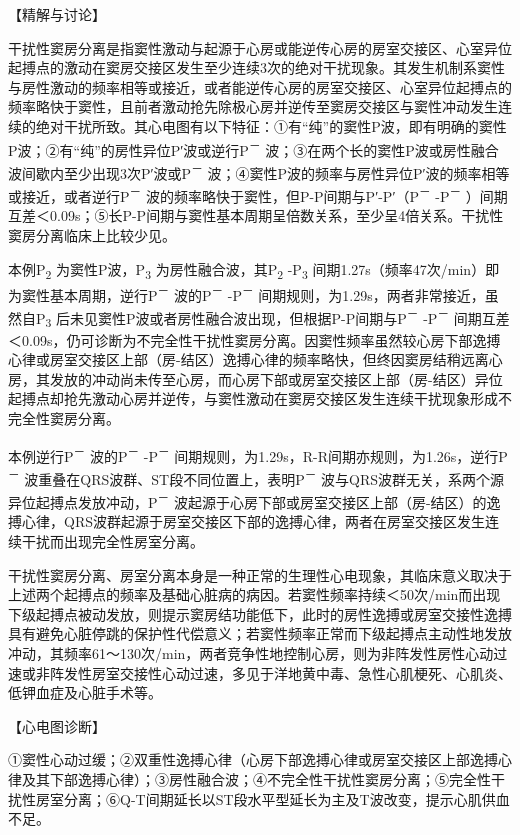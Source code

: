【精解与讨论】

干扰性窦房分离是指窦性激动与起源于心房或能逆传心房的房室交接区、心室异位起搏点的激动在窦房交接区发生至少连续3次的绝对干扰现象。其发生机制系窦性与房性激动的频率相等或接近，或者能逆传心房的房室交接区、心室异位起搏点的频率略快于窦性，且前者激动抢先除极心房并逆传至窦房交接区与窦性冲动发生连续的绝对干扰所致。其心电图有以下特征：①有“纯”的窦性P波，即有明确的窦性P波；②有“纯”的房性异位P′波或逆行P\textsuperscript{－}
波；③在两个长的窦性P波或房性融合波间歇内至少出现3次P′波或P\textsuperscript{－}
波；④窦性P波的频率与房性异位P′波的频率相等或接近，或者逆行P\textsuperscript{－}
波的频率略快于窦性，但P-P间期与P′-P′（P\textsuperscript{－}
-P\textsuperscript{－}
）间期互差＜0.09s；⑤长P-P间期与窦性基本周期呈倍数关系，至少呈4倍关系。干扰性窦房分离临床上比较少见。

本例P\textsubscript{2} 为窦性P波，P\textsubscript{3}
为房性融合波，其P\textsubscript{2} -P\textsubscript{3}
间期1.27s（频率47次/min）即为窦性基本周期，逆行P\textsuperscript{－}
波的P\textsuperscript{－} -P\textsuperscript{－}
间期规则，为1.29s，两者非常接近，虽然自P\textsubscript{3}
后未见窦性P波或者房性融合波出现，但根据P-P间期与P\textsuperscript{－}
-P\textsuperscript{－}
间期互差＜0.09s，仍可诊断为不完全性干扰性窦房分离。因窦性频率虽然较心房下部逸搏心律或房室交接区上部（房-结区）逸搏心律的频率略快，但终因窦房结稍远离心房，其发放的冲动尚未传至心房，而心房下部或房室交接区上部（房-结区）异位起搏点却抢先激动心房并逆传，与窦性激动在窦房交接区发生连续干扰现象形成不完全性窦房分离。

本例逆行P\textsuperscript{－} 波的P\textsuperscript{－}
-P\textsuperscript{－}
间期规则，为1.29s，R-R间期亦规则，为1.26s，逆行P\textsuperscript{－}
波重叠在QRS波群、ST段不同位置上，表明P\textsuperscript{－}
波与QRS波群无关，系两个源异位起搏点发放冲动，P\textsuperscript{－}
波起源于心房下部或房室交接区上部（房-结区）的逸搏心律，QRS波群起源于房室交接区下部的逸搏心律，两者在房室交接区发生连续干扰而出现完全性房室分离。

干扰性窦房分离、房室分离本身是一种正常的生理性心电现象，其临床意义取决于上述两个起搏点的频率及基础心脏病的病因。若窦性频率持续＜50次/min而出现下级起搏点被动发放，则提示窦房结功能低下，此时的房性逸搏或房室交接性逸搏具有避免心脏停跳的保护性代偿意义；若窦性频率正常而下级起搏点主动性地发放冲动，其频率61～130次/min，两者竞争性地控制心房，则为非阵发性房性心动过速或非阵发性房室交接性心动过速，多见于洋地黄中毒、急性心肌梗死、心肌炎、低钾血症及心脏手术等。

【心电图诊断】

①窦性心动过缓；②双重性逸搏心律（心房下部逸搏心律或房室交接区上部逸搏心律及其下部逸搏心律）；③房性融合波；④不完全性干扰性窦房分离；⑤完全性干扰性房室分离；⑥Q-T间期延长以ST段水平型延长为主及T波改变，提示心肌供血不足。

